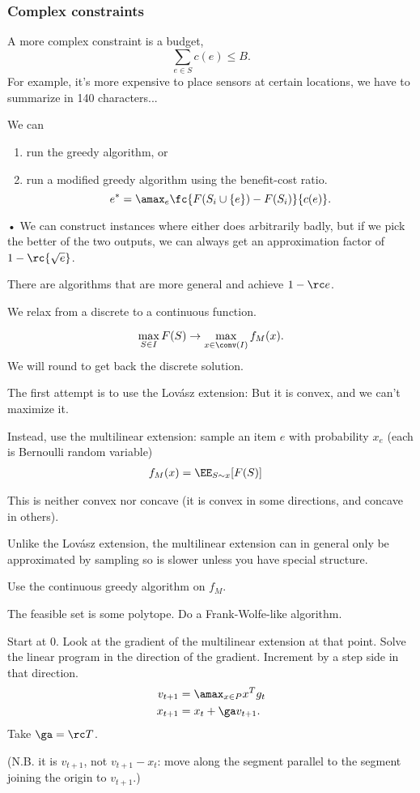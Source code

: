 \subsubsection{Complex constraints}

A more complex constraint is a budget,
$$
\sum_{e\in S} c(e)\le B.
$$
For example, it's more expensive to place sensors at certain locations, we have to summarize in 140 characters...

We can 
\begin{enumerate}
\item
run the greedy algorithm, or
\item
run a modified greedy algorithm using the benefit-cost ratio. 
$$
e^* = \amax_e \fc{F(S_i\cup \{e\}) - F(S_i)}{c(e)}.
$$
\end{enumerate}•
We can construct instances where either does arbitrarily badly, but if we pick the better of the two outputs, we  can always get an  approximation factor of $1-\rc{\sqrt e}$.

There are algorithms that are more general and achieve $1-\rc e$.
 
 We relax from a discrete to a continuous function.
 
$$\max_{S\in I}F(S) \to \max_{x\in \conv(I)} f_M(x).$$
 We will round to get back the discrete solution.
 
 The first attempt is to use the Lov\'asz extension: But it is convex, and we can't maximize it.
 
 Instead, use the multilinear extension: sample an item $e$ with probability $x_e$ (each is Bernoulli random variable)
 \begin{align}
 f_M(x) &= \EE_{S\sim x} [F(S)]
 \end{align}
 
This is neither convex nor concave (it is convex in some directions, and concave in others). 

Unlike the Lov\'asz extension, the multilinear extension can in general only be approximated by sampling so is slower unless you have special structure.

Use the continuous greedy algorithm on $f_M$. 

The feasible set is some polytope.  Do a Frank-Wolfe-like algorithm. 
\begin{alg}
Start at 0. Look at the gradient of the multilinear extension at that point. Solve the linear program in the direction of the gradient. Increment by a step side in that direction.
\begin{align}
v_{t+1}&=\amax_{x\in P} x^Tg_t\\
x_{t+1}&= x_t+\ga v_{t+1}.
\end{align}
Take $\ga = \rc T$.
\end{alg}
(N.B. it is $v_{t+1}$, not $v_{t+1}-x_t$: move along the segment parallel to the segment joining the origin to $v_{t+1}$.)

